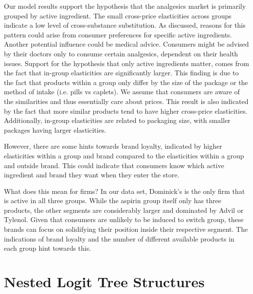 \documentclass[12pt, authoryear]{elsarticle}
\begin{document}
Our model results support the hypothesis that the analgesics market is primarily grouped by active ingredient. The small cross-price elasticities across groups indicate a low level of cross-substance substitution. As discussed, reasons for this pattern could arise from consumer preferences for specific active ingredients. Another potential influence could be medical advice. Consumers might be advised by their doctors only to consume certain analgesics, dependent on their health issues. Support for the hypothesis that only active ingredients matter, comes from the fact that in-group elasticities are significantly larger. This finding is due to the fact that products within a group only differ by the size of the package or the method of intake (i.e. pills vs caplets). We assume that consumers are aware of the similarities and thus essentially care about prices. This result is also indicated by the fact that more similar products tend to have higher cross-price elasticities. Additionally, in-group elasticities are related to packaging size, with smaller packages having larger elasticities. 

However, there are some hints towards brand loyalty, indicated by higher elasticities within a group and brand compared to the elasticities within a group and outside brand. This could indicate that consumers know which active ingredient and brand they want when they enter the store.

What does this mean for firms? In our data set, Dominick’s is the only firm that is active in all three groups. While the aspirin group itself only has three products, the other segments are considerably larger and dominated by Advil or Tylenol. Given that consumers are unlikely to be induced to switch group, these brands can focus on solidifying their position inside their respective segment. The indications of brand loyalty and the number of different available products in each group hint towards this. 

\pagebreak



\appendix
\setcounter{figure}{0}

\section{ Nested Logit Tree Structures}
\end{document}
